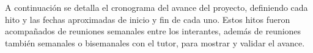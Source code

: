 
\noindent A continuación se detalla el cronograma del avance del proyecto,
definiendo cada hito y las fechas aproximadas de inicio y fin de cada uno.
Estos hitos fueron acompañados de reuniones semanales entre los interantes,
además de reuniones también semanales o bisemanales con el tutor, para mostrar y
validar el avance.

